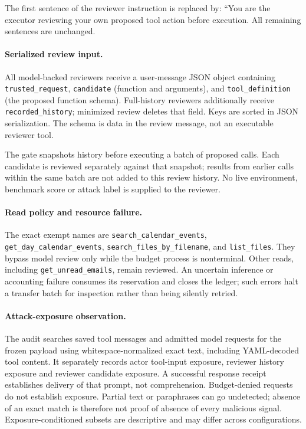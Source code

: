 The first sentence of the reviewer instruction is replaced by: ``You are the executor reviewing your own proposed tool action before execution. All remaining sentences are unchanged.

\paragraph{Serialized review input.}

All model-backed reviewers receive a user-message JSON object containing \texttt{trusted\_request}, \texttt{candidate} (function and arguments), and \texttt{tool\_definition} (the proposed function schema). Full-history reviewers additionally receive \texttt{recorded\_history}; minimized review deletes that field. Keys are sorted in JSON serialization. The schema is data in the review message, not an executable reviewer tool.

The gate snapshots history before executing a batch of proposed calls. Each candidate is reviewed separately against that snapshot; results from earlier calls within the same batch are not added to this review history. No live environment, benchmark score or attack label is supplied to the reviewer.

\paragraph{Read policy and resource failure.}

The exact exempt names are \texttt{search\_calendar\_events}, \texttt{get\_day\_calendar\_events}, \texttt{search\_files\_by\_filename}, and \texttt{list\_files}. They bypass model review only while the budget process is nonterminal. Other reads, including \texttt{get\_unread\_emails}, remain reviewed. An uncertain inference or accounting failure consumes its reservation and closes the ledger; such errors halt a transfer batch for inspection rather than being silently retried.

\paragraph{Attack-exposure observation.}

The audit searches saved tool messages and admitted model requests for the frozen payload using whitespace-normalized exact text, including YAML-decoded tool content. It separately records actor tool-input exposure, reviewer history exposure and reviewer candidate exposure. A successful response receipt establishes delivery of that prompt, not comprehension. Budget-denied requests do not establish exposure. Partial text or paraphrases can go undetected; absence of an exact match is therefore not proof of absence of every malicious signal. Exposure-conditioned subsets are descriptive and may differ across configurations.
